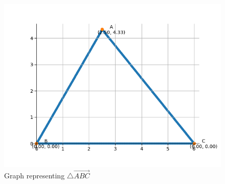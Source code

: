 \documentclass[journal]{IEEEtran}
\begin{document}
\begin{figure}[h!]
   \centering
   \includegraphics[width=0.7\linewidth]{figs/graph.png}
   \caption{Graph representing $\triangle \vec{ABC}$}
\end{figure}
\end{document}
